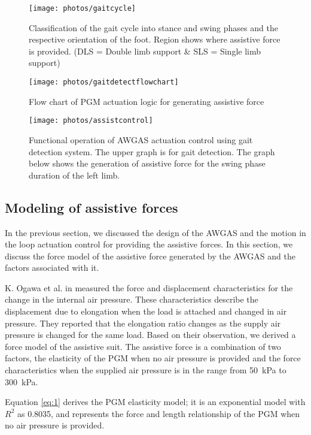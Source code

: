 \documentclass[paper,JRM,paper]{jaciiiarticle}
\begin{document}
\begin{figure}[h]
	\centering
	\texttt{[image: photos/gaitcycle]}
	\caption{Classification of the gait cycle into stance and swing phases and the respective orientation of the foot. Region shows where assistive force is provided. (DLS = Double limb support \& SLS = Single limb support) }
	\label{fig:gaitcycle}
\end{figure}

\begin{figure}[h]
	\centering
	\texttt{[image: photos/gaitdetectflowchart]}
	\caption{Flow chart of PGM actuation logic for generating assistive force}
	\label{fig:gaitdetectflowchart}
\end{figure}

\begin{figure}
	\centering
	\texttt{[image: photos/assistcontrol]}
	\caption{Functional operation of AWGAS actuation control using gait detection system. The upper graph is for gait detection. The graph below shows the generation of assistive force for the swing phase duration of the left limb.}
	\label{fig:assistcontrol}
\end{figure}


\subsection{Modeling of assistive forces}
In the previous section, we discussed the design of the AWGAS and the motion in the loop actuation control for providing the assistive forces. In this section, we discuss the force model of the assistive force generated by the AWGAS and the factors associated with it. 

K. Ogawa et al. in \cite{11} measured the force and displacement characteristics for the change in the internal air pressure. These characteristics describe the displacement due to elongation when the load is attached and changed in air pressure. They reported that the elongation ratio changes as the supply air pressure is changed for the same load. Based on their observation, we derived a force model of the assistive suit. The assistive force is a combination of two factors, the elasticity of the PGM when no air pressure is provided and the force characteristics when the supplied air pressure is in the range from \SI{50}{\kilo\pascal} to \SI{300}{\kilo\pascal}. 

Equation \ref{eq:1} derives the PGM elasticity model; it is an exponential model with $R^{2}$ as 0.8035, and represents the force and length relationship of the PGM when no air pressure is provided. 
\end{document}
